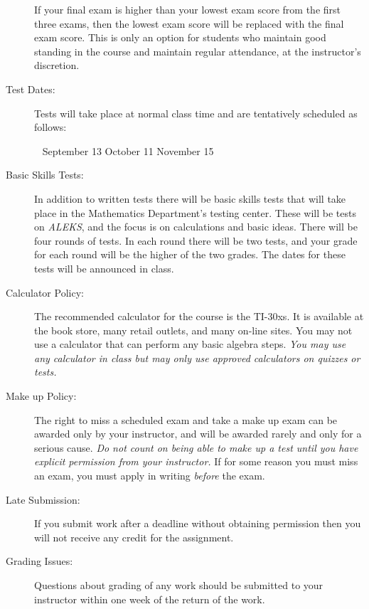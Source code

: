 \documentclass[letterpaper,11pt]{article}
\begin{document}
\begin{description}
  If your final exam is higher than your lowest exam score from the
  first three exams, then the lowest exam score will be replaced with
  the final exam score. This
  is only an option for students who maintain good standing in the
  course and maintain regular attendance, at the instructor's discretion.

\item[Test Dates:] Tests will take place at normal class time and are tentatively scheduled as follows:
  \begin{center}
    ~ \hfill September 13 \hfill October 11 \hfill November 15 \hfill ~
  \end{center}


\item[Basic Skills Tests:] In addition to written tests there will be
  basic skills tests that will take place in the Mathematics
  Department's testing center. These will be tests on \emph{ALEKS}, and
  the focus is on calculations and basic ideas. There will be four
  rounds of tests. In each round there will be two tests, and your
  grade for each round will be the higher of the two grades. The dates for
  these tests will be announced in class.

\item[Calculator Policy:] The recommended calculator for the course is
  the TI-30xs. It is available at the book store, many retail outlets,
  and many on-line sites. You may not use a calculator that can
  perform any basic algebra steps. \textit{You may use any calculator in class but
  may only use approved calculators on quizzes or tests.}

\item[Make up Policy:] The right to miss a scheduled exam and take a
  make up exam can be awarded only by your instructor, and will be
  awarded rarely and only for a serious cause.  \emph{Do not count
    on being able to make up a test until you have explicit permission
    from your instructor. }  If for some reason you must miss an exam,
  you must apply in writing \emph{before} the exam.

\item[Late Submission:] If you submit work after a deadline without obtaining
  permission then you will not receive any credit for the assignment. 

\item[Grading Issues:]  Questions about grading of any work should be submitted
  to your instructor within one week of the return of the
  work.




\end{description}
\end{document}
